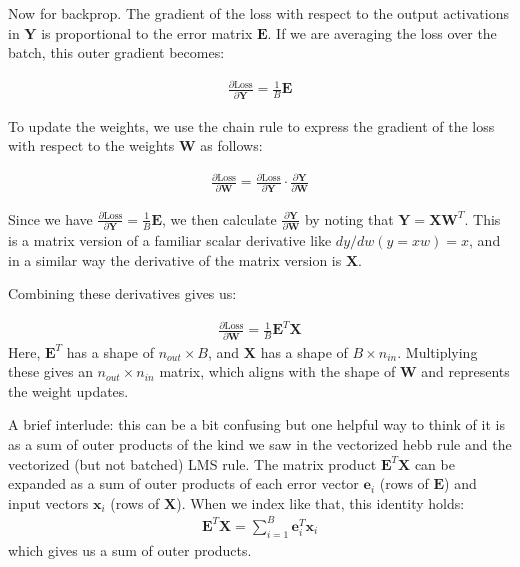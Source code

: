 Now for backprop. The gradient of the loss with respect to the output activations in $\mathbf{Y}$ is proportional to the error matrix $\mathbf{E}$. If we are averaging the loss over the batch, this outer gradient becomes:

\begin{eqnarray}
\frac{\partial \text{Loss}}{\partial \mathbf{Y}} = \frac{1}{B} \mathbf{E}
\end{eqnarray}

To update the weights, we use the chain rule to express the gradient of the loss with respect to the weights $\mathbf{W}$ as follows:

\begin{eqnarray}
\frac{\partial \text{Loss}}{\partial \mathbf{W}} = \frac{\partial \text{Loss}}{\partial \mathbf{Y}} \cdot \frac{\partial \mathbf{Y}}{\partial \mathbf{W}}
\end{eqnarray}

Since we have $\frac{\partial \text{Loss}}{\partial \mathbf{Y}} = \frac{1}{B} \mathbf{E}$, we then calculate $\frac{\partial \mathbf{Y}}{\partial \mathbf{W}}$ by noting that $\mathbf{Y} = \mathbf{X} \mathbf{W}^T$. This is a matrix version of a familiar scalar derivative like $dy/dw(y = xw) = x$, and in a similar way the derivative of the matrix version is $\mathbf{X}$. 

Combining these derivatives gives us:

\begin{eqnarray}
\frac{\partial \text{Loss}}{\partial \mathbf{W}} = \frac{1}{B} \mathbf{E}^T \mathbf{X}
\end{eqnarray}
Here, $\mathbf{E}^T$ has a shape of $n_{out} \times B$, and $\mathbf{X}$ has a shape of $B \times n_{in}$. Multiplying these gives an $n_{out} \times n_{in}$ matrix, which aligns with the shape of $\mathbf{W}$ and represents the weight updates.

A brief interlude: this can be a bit confusing but one helpful way to think of it is as a sum of outer products of the kind we saw in the vectorized hebb rule and the vectorized (but not batched) LMS rule. The matrix product $\mathbf{E}^T \mathbf{X}$ can be expanded as a sum of outer products of each error vector $\mathbf{e}_i$ (rows of $\mathbf{E}$) and input vectors $\mathbf{x}_i$ (rows of $\mathbf{X}$). When we index like that, this identity holds:
\begin{eqnarray}
\mathbf{E}^T \mathbf{X} = \sum_{i=1}^{B} \mathbf{e}_i^T \mathbf{x}_i
\end{eqnarray}
which gives us a sum of outer products.

